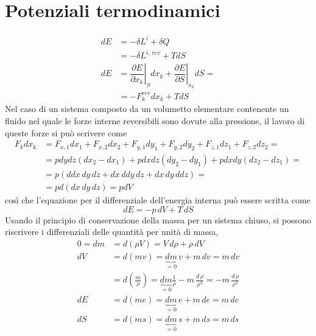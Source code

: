 \section{Potenziali termodinamici}
\begin{equation}
\begin{aligned}
    dE & = -\delta L^i + \delta Q \\
       & = -\delta L^{i, \, rev} + T dS \\
    dE & = \left.\dfrac{\partial E}{\partial x_k}\right|_{S} dx_k + \left.\dfrac{\partial E}{\partial S}\right|_{x_k} dS = \\
       & = -F_k^{rev} dx_k + T dS
\end{aligned}
\end{equation}
Nel caso di un sistema composto da un volumetto elementare contenente un fluido nel quale le forze interne reversibili sono dovute alla pressione, il lavoro di queste forze si può scrivere come
\begin{equation}
\begin{aligned}
    F_k dx_k & = F_{x,1} dx_1 + F_{x,2} dx_2 + F_{y,1} dy_1 + F_{y,2} dy_2 + F_{z,1} dz_1 + F_{z,2} dz_2 = \\
    & = p dy dz (dx_2 - dx_1) + p dx dz (dy_2 - dy_1) + p dx dy (dz_2 - dz_1) = \\
    & = p ( ddx \, dy \, dz + dx \, ddy \, dz + dx \, dy \, ddz ) = \\
    & = p d ( dx \, dy \, dz ) = p dV
\end{aligned}
\end{equation}
così che l'equazione per il differenziale dell'energia interna può essere scritta come
\begin{equation}
   dE = - p \, dV + T \, dS
\end{equation}
Usando il principio di conservazione della massa per un sistema chiuso, si possono riscrivere i differenziali delle quantità per unità di massa,
\begin{equation}
\begin{aligned}
    0 = dm & = d ( \rho V ) = V \, d \rho + \rho \, dV \\
        dV & = d (m v) = \underbrace{dm}_{=0} \, v + m \, d v = m \, d v \\
           & = d \left( \frac{m}{\rho} \right) = \underbrace{dm}_{=0} \frac{1}{\rho} - m \, \frac{d \, \rho}{\rho^2} = - m \, \frac{d \, \rho}{\rho^2} \\
        dE & = d (m e) = \underbrace{dm}_{=0} \, e + m \, d e = m \, d e \\
        dS & = d (m s) = \underbrace{dm}_{=0} \, s + m \, d s = m \, d s 
\end{aligned}
\end{equation}
